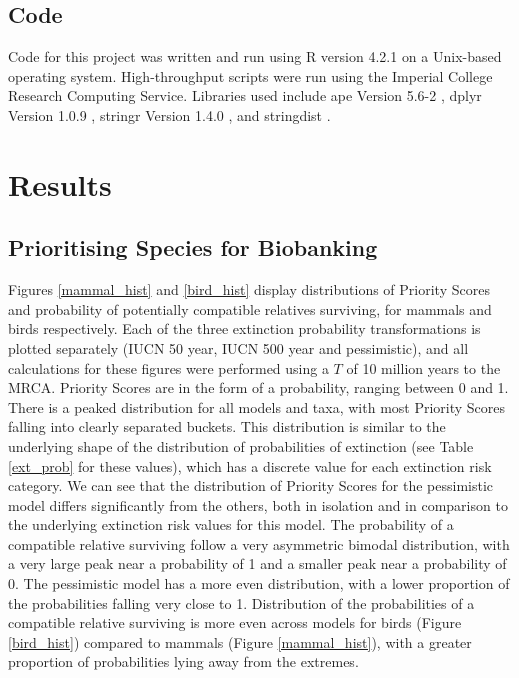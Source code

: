 \documentclass[12pt]{article}
\begin{document}
	
	\subsection{Code}
	Code for this project was written and run using R version 4.2.1 \citep{rcite}
	on a Unix-based operating system.
	High-throughput scripts were
	run using the Imperial College Research Computing Service.
	Libraries used
	include ape Version 5.6-2 \citep{paradisApeEnvironmentModern2019},
	dplyr Version 1.0.9 \citep{dplyr},
	stringr Version 1.4.0 \citep{stringr}, and stringdist \citep{stringdist}.
	
	\pagebreak
	
	\section{Results}
	\subsection{Prioritising Species for Biobanking}
	Figures \ref{mammal_hist} and  \ref{bird_hist} display distributions of
	Priority Scores and probability of potentially compatible relatives
	surviving, for mammals and birds respectively. Each of the
	three extinction probability transformations is plotted separately
	(IUCN 50 year, IUCN 500 year and pessimistic),
	and all calculations for these
	figures were performed using
	a $T$ of 10 million years to the MRCA. Priority Scores are in the form
	of a probability, ranging between 0 and 1. There is a peaked
	distribution for all models and taxa, with most Priority Scores falling into
	clearly separated buckets. This distribution is similar to the underlying
	shape of the distribution of probabilities of extinction (see Table \ref{ext_prob}
	for these values), which has a discrete value for each extinction risk
	category. We can see that the distribution of Priority Scores for the
	pessimistic model differs significantly from the others, both in isolation
	and in comparison to the underlying extinction risk values for this model.
	The probability of a compatible relative surviving follow a very asymmetric
	bimodal distribution, with a very large peak near a probability of 1 and
	a smaller peak near a probability of 0. The pessimistic
	model has a more even distribution, with a lower proportion of the probabilities
	falling very close to 1. Distribution of the probabilities of a compatible
	relative surviving
	is more even across models for birds (Figure \ref{bird_hist}) compared to
	mammals (Figure \ref{mammal_hist}), with a greater proportion of probabilities
	lying away from the extremes.
	
\end{document}
